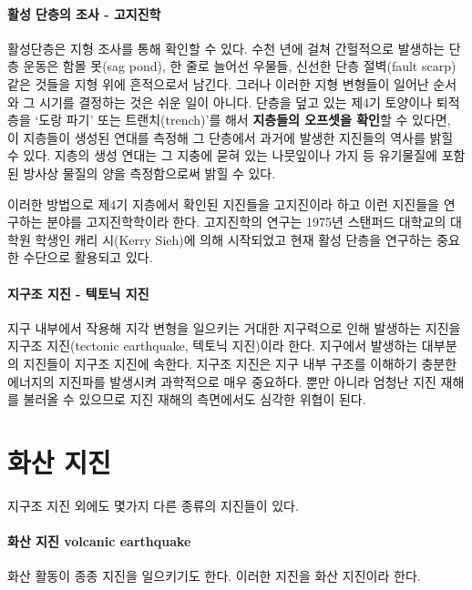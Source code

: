\documentclass[12pt, a4paper, oneside]{book}
\begin{document}
		\paragraph{활성 단층의 조사 - 고지진학}
		활성단층은 지형 조사를 통해 확인할 수 있다. 수천 년에 걸쳐 간헐적으로 발생하는 단층 운동은 함몰 못(sag pond), 한 줄로 늘어선 우물들, 신선한 단층 절벽(fault scarp) 같은 것들을 지형 위에 흔적으로서 남긴다.
		그러나 이러한 지형 변형들이 일어난 순서와 그 시기를 결정하는 것은 쉬운 일이 아니다.
		단층을 덮고 있는 제4기 토양이나 퇴적층을 `도랑 파기' 또는 트랜치(trench)'를 해서 \textbf{지층들의 오프셋을 확인}할 수 있다면, 이 지층들이 생성된 연대를 측정해 그 단층에서 과거에 발생한 지진들의 역사를 밝힐 수 있다.
		지층의 생성 연대는 그 지충에 묻혀 있는 나뭇잎이나 가지 등 유기물질에 포함된 방사상 물질의 양을 측정함으로써 밝힐 수 있다.
		
		이러한 방법으로 제4기 지층에서 확인된 지진들을 고지진이라 하고 이런 지진들을 연구하는 분야를 고지진학학이라 한다. 고지진학의 연구는 1975년 스탠퍼드 대학교의 대학원 학생인 캐리 시(Kerry Sieh)에 의해 시작되었고 현재 활성 단층을 연구하는 중요한 수단으로 활용되고 있다.
		
		\paragraph{지구조 지진 - 텍토닉 지진}
		지구 내부에서 작용해 지각 변형을 일으키는 거대한 지구력으로 인해 발생하는 지진을 지구조 지진(tectonic earthquake, 텍토닉 지진)이라 한다.
		지구에서 발생하는 대부분의 지진들이 지구조 지진에 속한다.
		지구조 지진은 지구 내부 구조를 이해하기 충분한 에너지의 지진파를 발생시켜 과학적으로 매우 중요하다.
		뿐만 아니라 엄청난 지진 재해를 불러올 수 있으므로 지진 재해의 측면에서도 심각한 위협이 된다. \\



	\clearpage
	\section{화산 지진}
		
		지구조 지진 외에도 몇가지 다른 종류의 지진들이 있다.

		\paragraph{화산 지진 volcanic earthquake}
		화산 활동이 종종 지진을 일으키기도 한다.
		이러한 지진을 화산 지진이라 한다.\\
		
\end{document}
